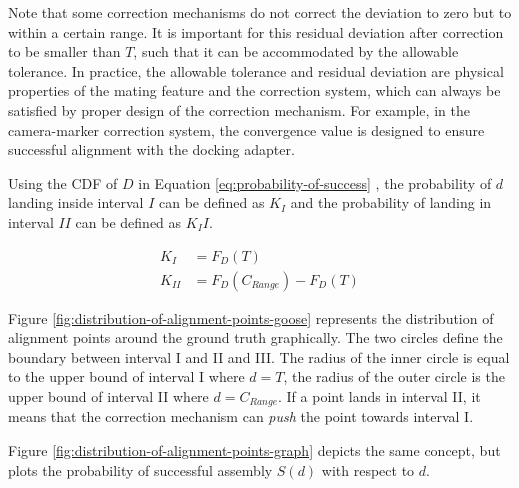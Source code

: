 Note that some correction mechanisms do not correct the deviation to zero but to within a certain range. It is important for this residual deviation after correction to be smaller than $T$, such that it can be accommodated by the allowable tolerance. In practice, the allowable tolerance and residual deviation are physical properties of the mating feature and the correction system, which can always be satisfied by proper design of the correction mechanism. For example, in the camera-marker correction system, the convergence value is designed to ensure successful alignment with the docking adapter.

Using the CDF of $D$ in Equation \ref{eq:probability-of-success} , the probability of $d$ landing inside interval $I$ can be defined as $K_I$ and the probability of landing in interval $II$ can be defined as $K_II$.

\begin{align}
    K_I &= F_D (T) \label{eq:probability-interval-I} \\
    K_{II} &= F_D (C_{Range}) - F_D (T) \label{eq:probability-interval-II}
\end{align}

Figure \ref{fig:distribution-of-alignment-points-goose} represents the distribution of alignment points around the ground truth graphically. The two circles define the boundary between interval \textrm{I} and \textrm{II} and \textrm{III}. The radius of the inner circle is equal to the upper bound of interval \textrm{I} where $d = T$, the radius of the outer circle is the upper bound of interval \textrm{II} where $d = C_{Range}$. If a point lands in interval \textrm{II}, it means that the correction mechanism can \textit{push} the point towards interval \textrm{I}.

Figure \ref{fig:distribution-of-alignment-points-graph} depicts the same concept, but plots the probability of successful assembly $S(d)$ with respect to $d$.

